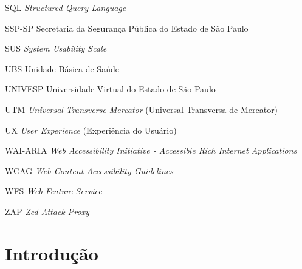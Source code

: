 \documentclass[
    12pt,
    oneside,            %
    a4paper,
    brazilian
    ]{abntex2}
\begin{document}
\begin{siglas}
  \item[SQL] \textit{Structured Query Language}
  \item[SSP-SP] Secretaria da Segurança Pública do Estado de São Paulo
  \item[SUS] \textit{System Usability Scale}
  \item[UBS] Unidade Básica de Saúde
  \item[UNIVESP] Universidade Virtual do Estado de São Paulo
  \item[UTM] \textit{Universal Transverse Mercator} (Universal Transversa de Mercator)
  \item[UX] \textit{User Experience} (Experiência do Usuário)
  \item[WAI-ARIA] \textit{Web Accessibility Initiative - Accessible Rich Internet Applications}
  \item[WCAG] \textit{Web Content Accessibility Guidelines}
  \item[WFS] \textit{Web Feature Service}
  \item[ZAP] \textit{Zed Attack Proxy}
\end{siglas}


\tableofcontents*
\cleardoublepage


\textual


\pagestyle{abntclean}

\section{Introdução}
\end{document}
